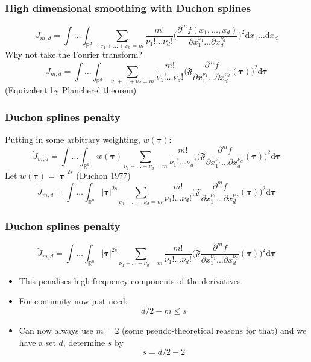 \documentclass[ignorenonframetext]{beamer} %
\newcommand{\bi}{\begin{itemize}}
\newcommand{\ei}{\end{itemize}}
\begin{document}
\begin{frame}
	\frametitle{High dimensional smoothing with Duchon splines}
	\begin{equation*}
		J_{m,d} = \int \ldots \int_{\mathbb{R}^d} \sum_{\nu_1 + \dots + \nu_d=m} \frac{m!}{\nu_1! \dots \nu_d!}\Big( \frac{\partial^m f(x_1,\dots,x_d)}{\partial x_1^{\nu_1} \ldots  \partial x_d^{\nu_d}} \Big)^2 \text{d} x_1 \ldots  \text{d} x_d
	\end{equation*}
	Why not take the Fourier transform? 
	\begin{equation*}
		J_{m,d} = \int \ldots \int_{\mathbb{R}^d} \sum_{\nu_1 + \dots + \nu_d=m} \frac{m!}{\nu_1! \dots \nu_d!}\Big( \mathfrak{F} \frac{\partial^m f}{\partial x_1^{\nu_1} \ldots  \partial x_d^{\nu_d}}(\boldsymbol{\tau}) \Big)^2 \text{d} \boldsymbol{\tau}
	\end{equation*}
	(Equivalent by Plancherel theorem)
\end{frame}

\begin{frame}
	\frametitle{Duchon splines penalty}
	Putting in some arbitrary weighting, $w(\boldsymbol{\tau})$:
	\begin{equation*}
		\breve{J}_{m,d} = \int \ldots \int_{\mathbb{R}^d} w(\boldsymbol{\tau}) \sum_{\nu_1 + \dots + \nu_d=m} \frac{m!}{\nu_1! \dots \nu_d!}\Big( \mathfrak{F} \frac{\partial^m f}{\partial x_1^{\nu_1} \ldots  \partial x_d^{\nu_d}}(\boldsymbol{\tau}) \Big)^2 \text{d} \boldsymbol{\tau}
	\end{equation*}
	Let $w(\boldsymbol{\tau})=\lvert \boldsymbol{\tau} \rvert^{2s}$ (Duchon 1977)
	\begin{equation*}
		\breve{J}_{m,d} = \int \ldots \int_{\mathbb{R}^n} \lvert \boldsymbol{\tau} \rvert^{2s} \sum_{\nu_1 + \dots + \nu_d=m} \frac{m!}{\nu_1! \dots \nu_d!}\Big( \mathfrak{F} \frac{\partial^m f}{\partial x_1^{\nu_1} \ldots  \partial x_d^{\nu_d}}(\boldsymbol{\tau}) \Big)^2 \text{d} \boldsymbol{\tau}
	\end{equation*}	
\end{frame}


\begin{frame}
	\frametitle{Duchon splines penalty}
	\begin{equation*}
		\breve{J}_{m,d} = \int \ldots \int_{\mathbb{R}^n} \lvert \boldsymbol{\tau} \rvert^{2s} \sum_{\nu_1 + \dots + \nu_d=m} \frac{m!}{\nu_1! \dots \nu_d!}\Big( \mathfrak{F} \frac{\partial^m f}{\partial x_1^{\nu_1} \ldots  \partial x_d^{\nu_d}}(\boldsymbol{\tau}) \Big)^2 \text{d} \boldsymbol{\tau}
	\end{equation*}	
	
	\bi
	\item This penalises high frequency components of the derivatives.
	\item For continuity now just need:
	\begin{equation*}
		d/2 -m \leq s
	\end{equation*}
	\item Can now always use $m=2$ (some pseudo-theoretical reasons for that) and we have a set $d$, determine $s$ by
	\begin{equation*}
		s=d/2-2
	\end{equation*}
	\ei
\end{frame}
\end{document}
